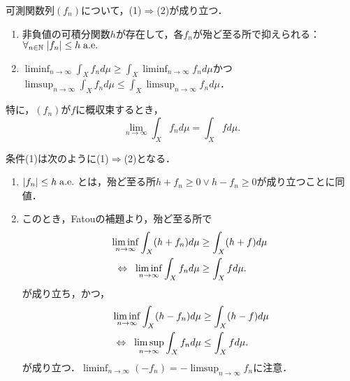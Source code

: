 \documentclass[uplatex, dvipdfmx]{jsreport}
\begin{document}
\begin{theorem}\label{thm-Lebesgue-convergence-theorem}
    可測関数列$(f_n)$について，(1)$\Rightarrow$(2)が成り立つ．
    \begin{enumerate}
        \item 非負値の可積分関数$h$が存在して，各$f_n$が殆ど至る所で抑えられる：$\forall_{n\in\mathbb{N}}\;\lvert f_n\rvert\le h\;\mathrm{a.e.}\;$
        \item $\liminf_{n\to\infty}\int_Xf_nd\mu\ge\int_X\liminf_{n\to\infty}f_nd\mu$かつ$\limsup_{n\to\infty}\int_Xf_nd\mu\le\int_X\limsup_{n\to\infty}f_nd\mu$．
    \end{enumerate}
    特に，$(f_n)$が$f$に概収束するとき，
    \[\lim_{n\to\infty}\int_Xf_nd\mu=\int_Xfd\mu.\]
\end{theorem}
\begin{Proof}
    条件(1)は次のように(1)$\Rightarrow$(2)となる．
    \begin{enumerate}
        \item $\lvert f_n\rvert\le h\;\mathrm{a.e.}\;$とは，殆ど至る所$h+f_n\ge 0\lor h-f_n\ge 0$が成り立つことに同値．
        \item このとき，Fatouの補題より，殆ど至る所で
        \begin{align*}
            \liminf_{n\to\infty}\int_X(h+f_n)d\mu&\ge\int_X(h+f)d\mu\\
            \;\;\Leftrightarrow\;\;\liminf_{n\to\infty}\int_Xf_nd\mu&\ge\int_Xfd\mu.
        \end{align*}
        が成り立ち，かつ，
        \begin{align*}
            \liminf_{n\to\infty}\int_X(h-f_n)d\mu&\ge\int_X(h-f)d\mu\\
            \;\;\Leftrightarrow\;\;\limsup_{n\to\infty}\int_Xf_nd\mu&\le\int_Xfd\mu.
        \end{align*}
        が成り立つ．$\liminf_{n\to\infty}(-f_n)=-\limsup_{n\to\infty}f_n$に注意．
    \end{enumerate}
\end{Proof}
\end{document}
